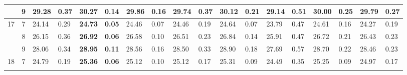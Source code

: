 \documentclass[conference]{IEEEtran}
\begin{document}
\begin{table}[t]
\begin{tabular}{|cc|ll|ll|ll|ll|ll|ll|ll|ll|}
		\multicolumn{1}{|c|}{}                    & 9          & \multicolumn{1}{l|}{29.28}         & 0.37                              & \multicolumn{1}{l|}{\textbf{30.27}} & \textbf{0.14}                     & \multicolumn{1}{l|}{29.86}         & 0.16                              & \multicolumn{1}{l|}{29.74}         & 0.37                              & \multicolumn{1}{l|}{30.12}                & 0.21          & \multicolumn{1}{l|}{29.14} & 0.51 & \multicolumn{1}{l|}{30.00}          & 0.25          & \multicolumn{1}{l|}{29.79} & 0.27 \\ \hline
		\multicolumn{1}{|c|}{\multirow{3}{*}{17}} & 7          & \multicolumn{1}{l|}{24.14}         & 0.29                              & \multicolumn{1}{l|}{\textbf{24.73}} & \textbf{0.05}                     & \multicolumn{1}{l|}{24.46}         & 0.07                              & \multicolumn{1}{l|}{24.46}         & 0.19                              & \multicolumn{1}{l|}{24.64}                & 0.07          & \multicolumn{1}{l|}{23.79} & 0.47 & \multicolumn{1}{l|}{24.61}          & 0.16          & \multicolumn{1}{l|}{24.27} & 0.19 \\ \cline{2-18} 
		\multicolumn{1}{|c|}{}                    & 8          & \multicolumn{1}{l|}{26.15}         & 0.36                              & \multicolumn{1}{l|}{\textbf{26.92}} & \textbf{0.06}                     & \multicolumn{1}{l|}{26.58}         & 0.10                              & \multicolumn{1}{l|}{26.51}         & 0.23                              & \multicolumn{1}{l|}{26.84}                & 0.14          & \multicolumn{1}{l|}{25.91} & 0.47 & \multicolumn{1}{l|}{26.72}          & 0.21          & \multicolumn{1}{l|}{26.43} & 0.23 \\ \cline{2-18} 
		\multicolumn{1}{|c|}{}                    & 9          & \multicolumn{1}{l|}{28.06}         & 0.34                              & \multicolumn{1}{l|}{\textbf{28.95}} & \textbf{0.11}                     & \multicolumn{1}{l|}{28.56}         & 0.16                              & \multicolumn{1}{l|}{28.50}         & 0.33                              & \multicolumn{1}{l|}{28.90}                & 0.18          & \multicolumn{1}{l|}{27.69} & 0.57 & \multicolumn{1}{l|}{28.70}          & 0.22          & \multicolumn{1}{l|}{28.46} & 0.23 \\ \hline
		\multicolumn{1}{|c|}{\multirow{3}{*}{18}} & 7          & \multicolumn{1}{l|}{24.79}         & 0.19                              & \multicolumn{1}{l|}{\textbf{25.36}} & \textbf{0.06}                     & \multicolumn{1}{l|}{25.12}         & 0.10                              & \multicolumn{1}{l|}{25.12}         & 0.17                              & \multicolumn{1}{l|}{25.31}                & 0.09          & \multicolumn{1}{l|}{24.49} & 0.35 & \multicolumn{1}{l|}{25.25}          & 0.09          & \multicolumn{1}{l|}{24.97} & 0.17 \\ \cline{2-18} 

\end{tabular}
\end{table}
\end{document}
